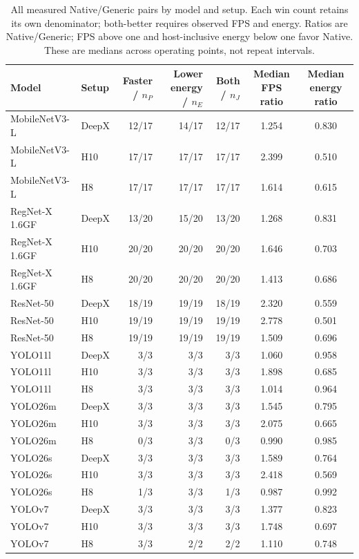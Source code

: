 \begingroup\small
\begin{longtable}{l l r r r S[table-format=1.3] S[table-format=1.3]}
\caption{All measured Native/Generic pairs by model and setup. Each win count retains its own denominator; both-better requires observed FPS and energy. Ratios are Native/Generic; FPS above one and host-inclusive energy below one favor Native. These are medians across operating points, not repeat intervals.}\\
\toprule
Model & Setup & Faster / $n_P$ & Lower energy / $n_E$ & Both / $n_J$ & {Median FPS ratio} & {Median energy ratio} \\
\midrule\endhead
MobileNetV3-L & DeepX & 12/17 & 14/17 & 12/17 & 1.254 & 0.830 \\
MobileNetV3-L & H10 & 17/17 & 17/17 & 17/17 & 2.399 & 0.510 \\
MobileNetV3-L & H8 & 17/17 & 17/17 & 17/17 & 1.614 & 0.615 \\
RegNet-X 1.6GF & DeepX & 13/20 & 15/20 & 13/20 & 1.268 & 0.831 \\
RegNet-X 1.6GF & H10 & 20/20 & 20/20 & 20/20 & 1.646 & 0.703 \\
RegNet-X 1.6GF & H8 & 20/20 & 20/20 & 20/20 & 1.413 & 0.686 \\
ResNet-50 & DeepX & 18/19 & 19/19 & 18/19 & 2.320 & 0.559 \\
ResNet-50 & H10 & 19/19 & 19/19 & 19/19 & 2.778 & 0.501 \\
ResNet-50 & H8 & 19/19 & 19/19 & 19/19 & 1.509 & 0.696 \\
YOLO11l & DeepX & 3/3 & 3/3 & 3/3 & 1.060 & 0.958 \\
YOLO11l & H10 & 3/3 & 3/3 & 3/3 & 1.898 & 0.685 \\
YOLO11l & H8 & 3/3 & 3/3 & 3/3 & 1.014 & 0.964 \\
YOLO26m & DeepX & 3/3 & 3/3 & 3/3 & 1.545 & 0.795 \\
YOLO26m & H10 & 3/3 & 3/3 & 3/3 & 2.075 & 0.665 \\
YOLO26m & H8 & 0/3 & 3/3 & 0/3 & 0.990 & 0.985 \\
YOLO26s & DeepX & 3/3 & 3/3 & 3/3 & 1.589 & 0.764 \\
YOLO26s & H10 & 3/3 & 3/3 & 3/3 & 2.418 & 0.569 \\
YOLO26s & H8 & 1/3 & 3/3 & 1/3 & 0.987 & 0.992 \\
YOLOv7 & DeepX & 3/3 & 3/3 & 3/3 & 1.377 & 0.823 \\
YOLOv7 & H10 & 3/3 & 3/3 & 3/3 & 1.748 & 0.697 \\
YOLOv7 & H8 & 3/3 & 2/2 & 2/2 & 1.110 & 0.748 \\
\bottomrule
\end{longtable}
\endgroup
